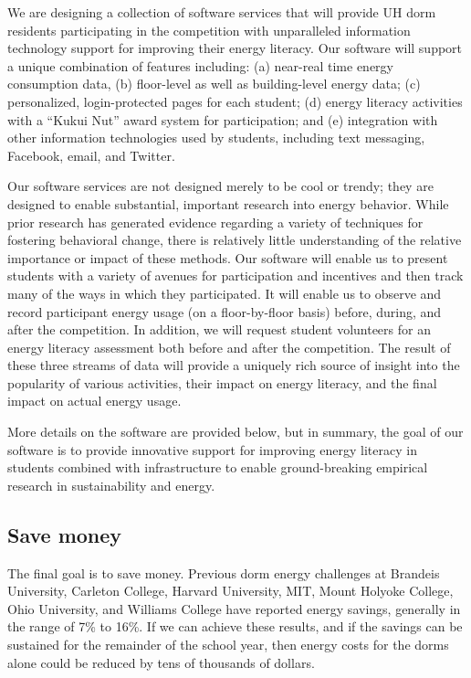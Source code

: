 \documentclass[11pt]{article}
\begin{document}
We are designing a collection of software services that will provide UH
dorm residents participating in the competition with unparalleled
information technology support for improving their energy literacy.  Our
software will support a unique combination of features including: (a)
near-real time energy consumption data, (b) floor-level as well as
building-level energy data; (c) personalized, login-protected pages for
each student; (d) energy literacy activities with a ``Kukui Nut'' award
system for participation; and (e) integration with other information
technologies used by students, including text messaging, Facebook, email,
and Twitter.

Our software services are not designed merely to be cool or trendy; they
are designed to enable substantial, important research into energy
behavior. While prior research has generated evidence regarding a variety
of techniques for fostering behavioral change, there is relatively little
understanding of the relative importance or impact of these methods.  Our
software will enable us to present students with a variety of avenues for
participation and incentives and then track many of the ways in which they
participated. It will enable us to observe and record participant energy
usage (on a floor-by-floor basis) before, during, and after the
competition.  In addition, we will request student volunteers for an energy
literacy assessment both before and after the competition.  The result of
these three streams of data will provide a uniquely rich source of insight
into the popularity of various activities, their impact on energy literacy,
and the final impact on actual energy usage.

More details on the software are provided below, but in summary, the goal
of our software is to provide innovative support for improving energy
literacy in students combined with infrastructure to enable ground-breaking
empirical research in sustainability and energy.

\subsection{Save money}

The final goal is to save money.  Previous dorm energy challenges at
Brandeis University, Carleton College, Harvard University, MIT, Mount
Holyoke College, Ohio University, and Williams College have reported energy
savings, generally in the range of 7\% to 16\%.  If we can achieve these
results, and if the savings can be sustained for the remainder of the
school year, then energy costs for the dorms alone could be reduced by tens
of thousands of dollars.
\end{document}
